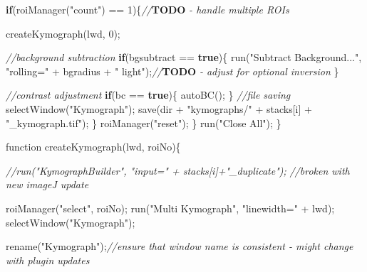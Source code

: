 \documentclass[
  12pt,
  a4paper,
]{book}
\newenvironment{Shaded}{}{}
\newcommand{\AlertTok}[1]{\textcolor[rgb]{1.00,0.00,0.00}{\textbf{#1}}}
\newcommand{\CommentTok}[1]{\textcolor[rgb]{0.38,0.63,0.69}{\textit{#1}}}
\newcommand{\ControlFlowTok}[1]{\textcolor[rgb]{0.00,0.44,0.13}{\textbf{#1}}}
\newcommand{\DecValTok}[1]{\textcolor[rgb]{0.25,0.63,0.44}{#1}}
\newcommand{\KeywordTok}[1]{\textcolor[rgb]{0.00,0.44,0.13}{\textbf{#1}}}
\newcommand{\NormalTok}[1]{#1}
\newcommand{\OperatorTok}[1]{\textcolor[rgb]{0.40,0.40,0.40}{#1}}
\newcommand{\StringTok}[1]{\textcolor[rgb]{0.25,0.44,0.63}{#1}}
\begin{document}
\begin{Shaded}
\begin{Highlighting}[]
        \ControlFlowTok{if}\OperatorTok{(}\NormalTok{roiManager}\OperatorTok{(}\StringTok{"count"}\OperatorTok{)} \OperatorTok{==} \DecValTok{1}\OperatorTok{)\{}\CommentTok{//}\AlertTok{TODO}\CommentTok{ {-} handle multiple ROIs}
    
\NormalTok{            createKymograph}\OperatorTok{(}\NormalTok{lwd}\OperatorTok{,} \DecValTok{0}\OperatorTok{);}
    
            \CommentTok{//background subtraction}
            \ControlFlowTok{if}\OperatorTok{(}\NormalTok{bgsubtract }\OperatorTok{==} \KeywordTok{true}\OperatorTok{)\{}
\NormalTok{                run}\OperatorTok{(}\StringTok{"Subtract Background..."}\OperatorTok{,} \StringTok{"rolling="} \OperatorTok{+}\NormalTok{ bgradius }\OperatorTok{+} \StringTok{" light"}\OperatorTok{);}\CommentTok{//}\AlertTok{TODO}\CommentTok{ {-} adjust for optional inversion}
            \OperatorTok{\}}
    
            \CommentTok{//contrast adjustment}
            \ControlFlowTok{if}\OperatorTok{(}\NormalTok{bc }\OperatorTok{==} \KeywordTok{true}\OperatorTok{)\{}
\NormalTok{                autoBC}\OperatorTok{();}
            \OperatorTok{\}}
            \CommentTok{//file saving}
\NormalTok{            selectWindow}\OperatorTok{(}\StringTok{"Kymograph"}\OperatorTok{);}
\NormalTok{            save}\OperatorTok{(}\NormalTok{dir }\OperatorTok{+} \StringTok{"kymographs/"} \OperatorTok{+}\NormalTok{ stacks}\OperatorTok{[}\NormalTok{i}\OperatorTok{]} \OperatorTok{+} \StringTok{"\_kymograph.tif"}\OperatorTok{);}
        \OperatorTok{\}}
\NormalTok{        roiManager}\OperatorTok{(}\StringTok{"reset"}\OperatorTok{);}
    \OperatorTok{\}}
\NormalTok{    run}\OperatorTok{(}\StringTok{"Close All"}\OperatorTok{);}
\OperatorTok{\}}

\NormalTok{function createKymograph}\OperatorTok{(}\NormalTok{lwd}\OperatorTok{,}\NormalTok{ roiNo}\OperatorTok{)\{}
    
    \CommentTok{//run("KymographBuilder", "input=" + stacks[i]+"\_duplicate");}
        \CommentTok{//broken with new imageJ update}
        
\NormalTok{    roiManager}\OperatorTok{(}\StringTok{"select"}\OperatorTok{,}\NormalTok{ roiNo}\OperatorTok{);}
\NormalTok{    run}\OperatorTok{(}\StringTok{"Multi Kymograph"}\OperatorTok{,} \StringTok{"linewidth="} \OperatorTok{+}\NormalTok{ lwd}\OperatorTok{);}
\NormalTok{    selectWindow}\OperatorTok{(}\StringTok{"Kymograph"}\OperatorTok{);}
    
\NormalTok{    rename}\OperatorTok{(}\StringTok{"Kymograph"}\OperatorTok{);}\CommentTok{//ensure that window name is consistent {-} might change with plugin updates}
    

\end{Highlighting}
\end{Shaded}
\end{document}
